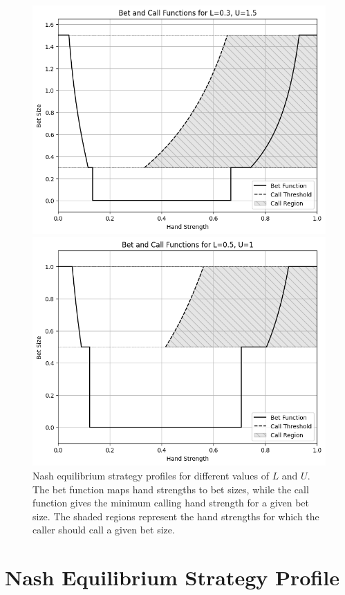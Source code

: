 \documentclass[a4paper,12pt]{article}
\begin{document}
\begin{figure}[h!]
    \vspace{0.5cm}
    \begin{minipage}{0.45\textwidth}
        \centering
        \includegraphics[width=\textwidth]{limit_continous_0.3_1.5.png}
    \end{minipage}
    \begin{minipage}{0.45\textwidth}
        \centering
        \includegraphics[width=\textwidth]{limit_continuous_0.5_1.png}
    \end{minipage}
    \caption{Nash equilibrium strategy profiles for different values of $L$ and $U$. The bet function maps hand strengths to bet sizes, while the call function gives the minimum calling hand strength for a given bet size. The shaded regions represent the hand strengths for which the caller should call a given bet size.}
\end{figure}



\section{Nash Equilibrium Strategy Profile}
\end{document}

